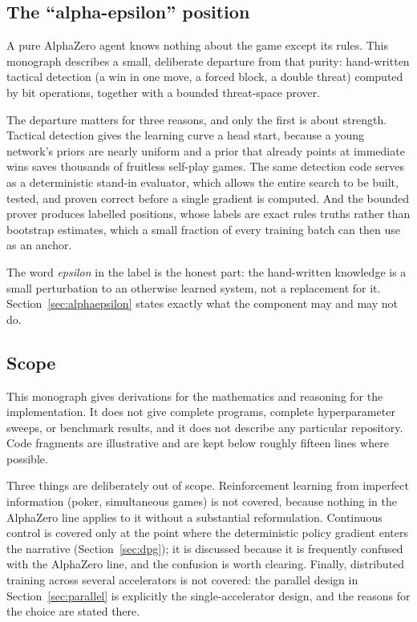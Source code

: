 \subsection{The ``alpha-epsilon'' position}

A pure AlphaZero agent knows nothing about the game except its rules. This
monograph describes a small, deliberate departure from that purity: hand-written
tactical detection (a win in one move, a forced block, a double threat) computed
by bit operations, together with a bounded threat-space prover.

The departure matters for three reasons, and only the first is about strength.
Tactical detection gives the learning curve a head start, because a young
network's priors are nearly uniform and a prior that already points at immediate
wins saves thousands of fruitless self-play games. The same detection code
serves as a deterministic stand-in evaluator, which allows the entire search to
be built, tested, and proven correct before a single gradient is computed. And
the bounded prover produces labelled positions, whose labels are exact rules
truths rather than bootstrap estimates, which a small fraction of every training
batch can then use as an anchor.

The word \emph{epsilon} in the label is the honest part: the hand-written
knowledge is a small perturbation to an otherwise learned system, not a
replacement for it. Section~\ref{sec:alphaepsilon} states exactly what the
component may and may not do.

\subsection{Scope}

This monograph gives derivations for the mathematics and reasoning for the
implementation. It does not give complete programs, complete hyperparameter
sweeps, or benchmark results, and it does not describe any particular
repository. Code fragments are illustrative and are kept below roughly fifteen
lines where possible.

Three things are deliberately out of scope. Reinforcement learning from
imperfect information (poker, simultaneous games) is not covered, because nothing
in the AlphaZero line applies to it without a substantial reformulation.
Continuous control is covered only at the point where the deterministic policy
gradient enters the narrative (Section~\ref{sec:dpg}); it is discussed because
it is frequently confused with the AlphaZero line, and the confusion is worth
clearing. Finally, distributed training across several accelerators is not
covered: the parallel design in Section~\ref{sec:parallel} is explicitly the
single-accelerator design, and the reasons for the choice are stated there.

